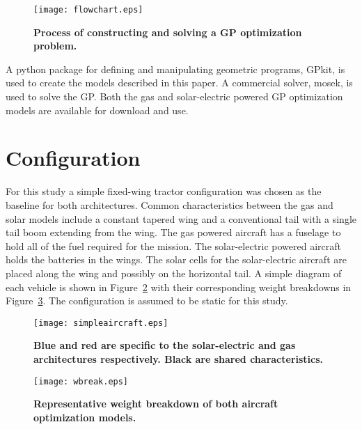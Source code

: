 \begin{figure}[h!]
	\begin{center}
	\texttt{[image: flowchart.eps]}
    \caption{\textbf{Process of constructing and solving a GP optimization problem. }}
	\label{f:flowchart}
	\end{center}
\end{figure}

A python package for defining and manipulating geometric programs, GPkit\cite{gpkitdocs}, is used to create the models described in this paper.  
A commercial solver, mosek\cite{mosek}, is used to solve the GP. 
Both the gas and solar-electric powered GP optimization models are available for download and use. \cite{gassolartrade} \\

\section{Configuration}

For this study a simple fixed-wing tractor configuration was chosen as the baseline for both architectures. 
Common characteristics between the gas and solar models include a constant tapered wing and a conventional tail with a single tail boom extending from the wing.  
The gas powered aircraft has a fuselage to hold all of the fuel required for the mission.  
The solar-electric powered aircraft holds the batteries in the wings.  
The solar cells for the solar-electric aircraft are placed along the wing and possibly on the horizontal tail.  
A simple diagram of each vehicle is shown in Figure~\ref{f:simpleaircraft} with their corresponding weight breakdowns in Figure~\ref{f:wbreak}.
The configuration is assumed to be static for this study.

\begin{figure}[h!]
	\begin{center}
	\texttt{[image: simpleaircraft.eps]}
    \caption{\textbf{Blue and red are specific to the solar-electric and gas architectures respectively.  Black are shared characteristics.}}
	\label{f:simpleaircraft}
	\end{center}
\end{figure}

\begin{figure}[h!]
	\begin{center}
	\texttt{[image: wbreak.eps]}
   \caption{\textbf{Representative weight breakdown of both aircraft optimization models.}}
	\label{f:wbreak}
	\end{center}
\end{figure}

